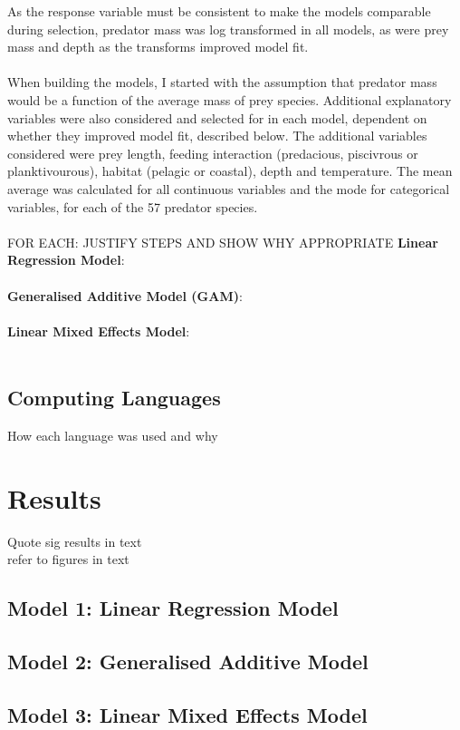\documentclass[11pt,a4paper,titlepage]{article}
\begin{document}
	
	As the response variable must be consistent to make the models comparable during selection, predator mass was log transformed in all models, as were prey mass and depth as the transforms improved model fit.\\
	\\
	When building the models, I started with the assumption that predator mass would be a function of the average mass of prey species. Additional explanatory variables were also considered and selected for in each model, dependent on whether they improved model fit, described below. The additional variables considered were prey length, feeding interaction (predacious, piscivrous or planktivourous), habitat (pelagic or coastal), depth and temperature. The mean average was calculated for all continuous variables and the mode for categorical variables, for each of the 57 predator species.\\
	\\
	FOR EACH: JUSTIFY STEPS AND SHOW WHY APPROPRIATE
	\textbf{Linear Regression Model}: \\
	\\
	\textbf{Generalised Additive Model (GAM)}: \\
	\\
	\textbf{Linear Mixed Effects Model}: \\
	\\

	\subsection{Computing Languages}
	
	How each language was used and why
	
	\section{Results}
	
	Quote sig results in text\\
	refer to figures in text\\
	\subsection{Model 1: Linear Regression Model}
	\subsection{Model 2: Generalised Additive Model}
	\subsection{Model 3: Linear Mixed Effects Model}
\end{document}
